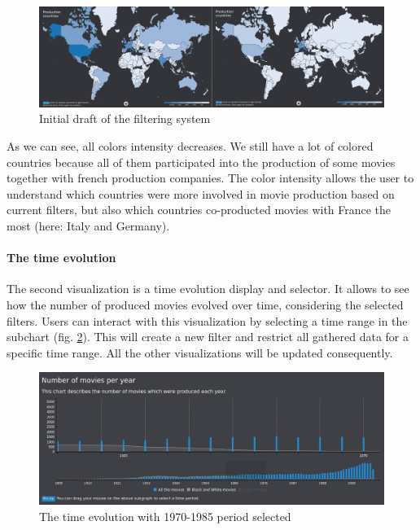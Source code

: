 \documentclass[a4paper,10pt]{article}
\begin{document}
\begin{figure}[ht]
  \centering
  \includegraphics[width=1\linewidth]{images/screens/country-selection.png}
  \caption{Initial draft of the filtering system} \label{fig:country-selection}
\end{figure}

As we can see, all colors intensity decreases. We still have a lot of colored countries
because all of them participated into the production of some movies together with
french production companies. The color intensity allows the user to understand which
countries were more involved in movie production based on current filters, but also
which countries co-producted movies with France the most (here: Italy and Germany).

\paragraph{The time evolution}

The second visualization is a time evolution display and selector. It allows to
see how the number of produced movies evolved over time, considering the selected
filters. Users can interact with this visualization by selecting a time range in the
subchart (fig. \ref{fig:time-selection}). This will create a new filter and restrict all gathered data for a specific
time range. All the other visualizations will be updated consequently.

\begin{figure}[ht]
  \centering
  \includegraphics[width=1\linewidth]{images/screens/time-selection.png}
  \caption{The time evolution with 1970-1985 period selected} \label{fig:time-selection}
\end{figure}
\end{document}
